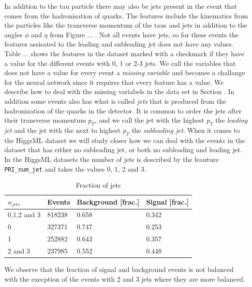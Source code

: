 \documentclass[../../main/main.tex]{subfiles}
\begin{document}
In addition to the tau particle there may also be jets present in the event that comes from the hadronisation of quarks. The features include the kinematics from the particles like the transverse momentum of the taus and jets in addition to the angles \(\phi\) and \(\eta\) from Figure ... . Not all events have jets, so for these events the features assisated to the leading and subleading jet does not have any values. Table ... shows the features in the dataset marked with a checkmark if they have a value for the different events with 0, 1 or 2-3 jets. We call the variables that does not have a value for every event a \emph{missing variable} and becomes a challange for the neural network since it requires that every feature has a value. We describe how to deal with the missing variabels in the data set in Section . In addition some events also has what is called \emph{jets} that is produced from the hadronization of the quarks in the detector. It is common to order the jets after their transverse momentum \(p_T\), and we call the jet with the highest \(p_T\) the \emph{leading jet} and the jet with the next to highest \(p_T\) the \emph{subleading jet}. When it comes to the HiggsML dataset we will study closer how we can deal with the events in the dataset that has either no subleading jet, or both no subleading and leading jet. In the HiggsML datasets the number of jets is described by the feauture \texttt{PRI\_num\_jet} and takes the values 0, 1, 2 and 3.

\begin{table}[H]
  \centering
  \caption{Fraction of jets}  
  \begin{ruledtabular}
    \begin{tabular}{l|lll}
      \(n_{jets}\) & Events & Background [frac.] & Signal [frac.] \\
      \hline
      0,1,2 and 3 & 818238  & 0.658 & 0.342 \\
      \hline
      0 &  327371 & 0.747 & 0.253 \\
      1 & 252882 & 0.643 & 0.357 \\
      2 and 3 & 237985 & 0.552 & 0.448 \\
    \end{tabular}
  \end{ruledtabular}
  \label{tab:events}
\end{table}

We observe that the fraction of signal and background events is not balanced with the execption of the events with 2 and 3 jets where they are more balanced.
\end{document}

